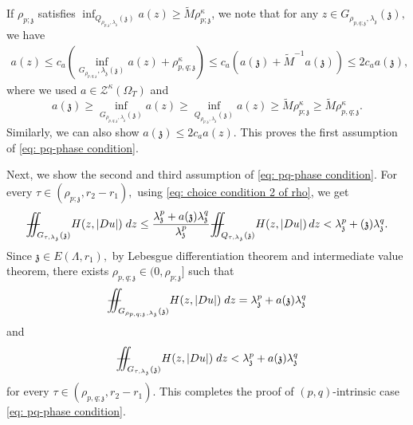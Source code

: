 \documentclass[notitlepage,11pt,reqno]{amsart}
\theoremstyle{definition}
\numberwithin{equation}{section}
\newcommand{\iintss}{{\int\hspace{-0.28cm}\int}}
\newcommand{ \miints }{{\iintss\hspace{-0.56cm} -\hspace{-0.15cm}-}}
\newcommand{\miint}[1]{{\miints_{\hspace{-0.13cm}#1}}}
\begin{document}
If $\rho_{p; \mathfrak z}$ satisfies $\inf_{Q_{\rho_{p; \mathfrak z}, \lambda_{\mathfrak z}}(\mathfrak z)}a(z)\geq \widetilde M\rho^{\kappa}_{p; \mathfrak z}$, we note that for any $z \in G_{\rho_{p,q; \mathfrak z}, \lambda_{\mathfrak z}}(\mathfrak z),$ we have 
\begin{align*}
    a(z)\leq c_a \left(\inf_{G_{\rho_{p,q; \mathfrak z}}, \lambda_{\mathfrak z}(\mathfrak z)}a(z)+\rho^{\kappa}_{p,q;\mathfrak z}\right)\leq c_a(a(\mathfrak z)+ \widetilde M^{-1}a(\mathfrak z))\leq 2c_a a(\mathfrak z),
\end{align*}
where we used $a\in \mathcal{Z}^{\kappa}(\Omega_T)$ and $$a(\mathfrak z)\geq \inf_{G_{\rho_{p,q; \mathfrak z}, \lambda_{\mathfrak z}}(\mathfrak z)}a( z)\geq \inf_{Q_{\rho_{p; \mathfrak z}, \lambda_{\mathfrak z}}(\mathfrak z)}a(z)\geq  \widetilde M\rho^{\kappa}_{p; \mathfrak z}\geq \widetilde M \rho^{\kappa}_{p,q; \mathfrak z}.$$ Similarly, we can also show $a(\mathfrak z)\leq 2c_a a(z)$. This proves the first assumption of \eqref{eq: pq-phase condition}.

Next, we show the second and third assumption of \eqref{eq: pq-phase condition}. For every $\tau \in (\rho_{p; \mathfrak z}, r_2-r_1),$ using \eqref{eq: choice condition 2 of rho}, we get 
\begin{align*}\label{eq : basic inequality 1 in section 5}
    \miint{G_{\tau,\lambda_\mathfrak{z}}(\mathfrak{z})} H(z,|Du|)\; dz \leq \frac{\lambda^p_{\mathfrak z}+a(\mathfrak z)\lambda^q_{\mathfrak z}}{\lambda^p_{\mathfrak z}}\miint{Q_{\tau, \lambda_{\mathfrak z}}(\mathfrak z)} H(z, |Du|)\, dz< \lambda^p_{\mathfrak z}+(\mathfrak z)\lambda^q_{\mathfrak z}.
\end{align*}
Since $\mathfrak{z}\in E(\Lambda,r_1),$ by Lebesgue differentiation theorem and intermediate value theorem,  there exists $\rho_{p, q; \mathfrak z}\in (0, \rho_{p; \mathfrak z}]$ such that 
\begin{equation*}    \label{eq: choice condition 1 of pq phase}
    \miint{G_{\rho_{p,q;\mathfrak{z}},\lambda_\mathfrak{z}}(\mathfrak{z})} H(z,|Du|)\; dz=\lambda^p_{\mathfrak z}+a(\mathfrak{z})\lambda_\mathfrak{z}^q
\end{equation*}
and
\begin{equation*}    \label{eq: choice condition 2 of pq phase}
    \miint{G_{\tau,\lambda_\mathfrak{z}}(\mathfrak{z})} H(z,|Du|)\; dz< \lambda^p_{\mathfrak z}+a(\mathfrak{z})\lambda_\mathfrak{z}^q
\end{equation*}
for every $\tau\in(\rho_{p,q; \mathfrak{z}},r_2-r_1).$ This completes the proof of $(p, q)$-intrinsic case \eqref{eq: pq-phase condition}. 
\end{document}
